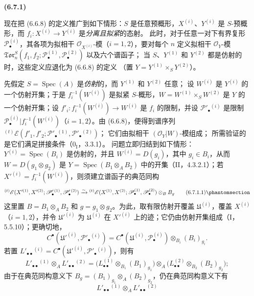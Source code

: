 \documentclass[UTF8,fontset=none,11pt,oneside,openany]{ctexbook}
\newenvironment{env}[1][]{%
  \par\medskip\noindent\textbf{(#1)}\ %
}{\par}
\newcommand{\oldpage}[2][]{%
  \hypertarget{ega-source-page-#1-#2}{}%
  \marginnote{\scriptsize\textbf{#1}~|~#2}\ignorespaces}
\let\EGAOriginalLabel\label
\renewcommand{\label}[1]{\phantomsection\EGAOriginalLabel{#1}}
\begin{document}
\begin{env}[6.7.1]
现在把 (6.6.8) 的定义推广到如下情形：$S$ 是任意预概形，$X^{(i)}$、$Y^{(i)}$
是 $S$-预概形，而 $f_i:X^{(i)}\to Y^{(i)}$ 是\emph{分离且拟紧}的态射。
此时，对于任意一对下有界复形 $\mathscr P_\bullet^{(i)}$，其各项为拟相干
$\mathscr O_{X^{(i)}}$-模（$i=1,2$），要对每个 $n$ 定义拟相干 $\mathscr O_Y$-模
$\mathfrak{Tor}_n^S
(f_1,f_2;\mathscr P_\bullet^{(1)},\mathscr P_\bullet^{(2)})$ 以及六个谱函子；
当 $S$、$Y^{(1)}$ 和 $Y^{(2)}$ 都是仿射的时，这些定义应退化为 (6.6.8) 的定义
（置 $Y=Y^{(1)}\times_S Y^{(2)}$）。

先假定 $S=\operatorname{Spec}(A)$ 是\emph{仿射}的，而 $Y^{(1)}$ 和 $Y^{(2)}$ 任意；
设 $W^{(i)}$ 是 $Y^{(i)}$ 的一个仿射开集；于是 $f_i^{-1}(W^{(i)})$ 是拟紧
$S$-概形，$W=W^{(1)}\times_S W^{(2)}$ 是 $Y$ 的一个仿射开集；设
$f'_i:f_i^{-1}(W^{(i)})\to W^{(i)}$ 是 $f_i$ 的限制，并设
$\mathscr P'_\bullet{}^{(i)}$ 是限制
$\mathscr P_\bullet^{(i)}|f_i^{-1}(W^{(i)})$（$i=1,2$）。由 (6.6.8)，便得到谱序列
${}^{(t)}\mathscr E
(f'_1,f'_2;\mathscr P'_\bullet{}^{(1)},\mathscr P'_\bullet{}^{(2)})$；
它们由拟相干 $(\mathscr O_Y|W)$-模组成；
所需验证的是它们满足拼接条件（$0_{\mathrm I}$，3.3.1）。
问题立即归结到如下情形：$Y^{(i)}=\operatorname{Spec}(B_i)$ 是仿射的，并且
$W^{(i)}=D(g_i)$，其中 $g_i\in B_i$，从而
$W=D(g_1\otimes g_2)$
\oldpage[III]{158}
是 $Y=\operatorname{Spec}(B_1\otimes_A B_2)$ 中的开集（II，4.3.2.1）；若
$X'^{(i)}=f_i^{-1}(W^{(i)})$，则须建立谱函子的典范同构
\[
  {}^{(t)}\mathscr E
  (X'^{(1)},X'^{(2)};
   \mathscr P'_\bullet{}^{(1)},\mathscr P'_\bullet{}^{(2)})
  \xrightarrow{\sim}
  {}^{(t)}\mathscr E
  (X^{(1)},X^{(2)};
   \mathscr P_\bullet^{(1)},\mathscr P_\bullet^{(2)})
  \otimes_B B_g
  \tag{6.7.1.1}\label{III.6.7.1.1.fr}
\]
这里置 $B=B_1\otimes_A B_2$ 和 $g=g_1\otimes g_2$。为此，取有限仿射开覆盖
$\mathfrak U^{(i)}$，覆盖 $X^{(i)}$（$i=1,2$），并令 $\mathfrak U'^{(i)}$ 为
$\mathfrak U^{(i)}$ 在 $X'^{(i)}$ 上的迹；它仍由仿射开集组成（I，5.5.10）；更确切地，
\[
  C^\bullet(\mathfrak U'^{(i)},\mathscr P'_\bullet{}^{(i)})
  =C^\bullet(\mathfrak U^{(i)},\mathscr P_\bullet^{(i)})
   \otimes_{B_i}(B_i)_{g_i}.
\]
若置
$L'_{\bullet\bullet}{}^{(i)}
=C^\bullet(\mathfrak U'^{(i)},\mathscr P'_\bullet{}^{(i)})$，则有
\[
  L'_{\bullet\bullet}{}^{(1)}\otimes_A L'_{\bullet\bullet}{}^{(2)}
  =\bigl(L_{\bullet\bullet}^{(1)}\otimes_{B_1}(B_1)_{g_1}\bigr)
   \otimes_A
   \bigl(L_{\bullet\bullet}^{(2)}\otimes_{B_2}(B_2)_{g_2}\bigr);
\]
由于在典范同构意义下 $B_g=(B_1)_{g_1}\otimes_A(B_2)_{g_2}$，仍在典范同构意义下有
\[
  L'_{\bullet\bullet}{}^{(1)}\otimes_A L'_{\bullet\bullet}{}^{(2)}
\]
\end{env}
\end{document}
